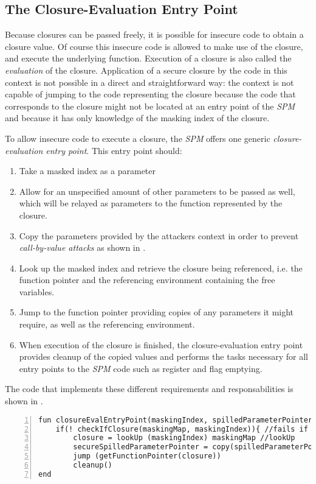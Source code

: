 \subsection{The Closure-Evaluation Entry Point}

Because closures can be passed freely, it is possible for insecure code to obtain a closure value.
Of course this insecure code is allowed to make use of the closure, and execute the underlying function.
Execution of a closure is also called the \emph{evaluation} of the closure.
Application of a secure closure by the code in this context is not possible in a direct and straightforward way: the context is not capable of jumping to the code representing the closure because the code that corresponds to the closure might not be located at an entry point of the \emph{SPM} and because it has only knowledge of the masking index of the closure.

To allow insecure code to execute a closure, the \emph{SPM} offers one generic \emph{closure-evaluation entry point}. This entry point should:

\begin{enumerate}
\item Take a masked index as a parameter
\item Allow for an unspecified amount of other parameters to be passed as well, which will be relayed as parameters to the function represented by the closure.
\item Copy the parameters provided by the attackers context in order to prevent \emph{call-by-value attacks} as shown in .
\item Look up the masked index and retrieve the closure being referenced, i.e. the function pointer and the referencing environment containing the free variables.
\item Jump to the function pointer providing copies of any parameters it might require, as well as the referencing environment.
\item When execution of the closure is finished, the closure-evaluation entry point provides cleanup of the copied values and performs the tasks necessary for all entry points to the \emph{SPM} code such as register and flag emptying.
\end{enumerate}

The code that implements these different requirements and responsabilities is shown in .

\begin{lstlisting}[frame=single,numbers=left, language={[x86masm]Assembler}, caption={[Generic Closure Evaluation: Pseudocode]The generic closure-evaluation entry point.},
label=llvm:EvalEntryPoint]
fun closureEvalEntryPoint(maskingIndex, spilledParameterPointer)
    if(! checkIfClosure(maskingMap, maskingIndex)){ //fails if the index does not exist or does not reference a closure.
        closure = lookUp (maskingIndex) maskingMap //lookUp
        secureSpilledParameterPointer = copy(spilledParameterPointer)
        jump (getFunctionPointer(closure))
        cleanup()
end 
\end{lstlisting}

